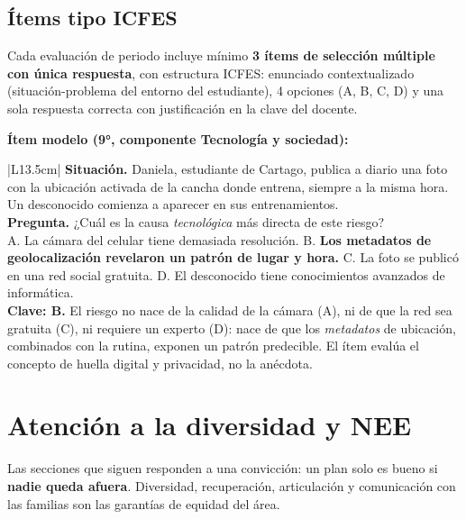 \documentclass[12pt, a4paper]{article}
\begin{document}
\subsection{Ítems tipo ICFES}

Cada evaluación de periodo incluye mínimo \textbf{3 ítems de selección múltiple
con única respuesta}, con estructura ICFES: enunciado contextualizado (situación-problema
del entorno del estudiante), 4 opciones (A, B, C, D) y una sola respuesta correcta
con justificación en la clave del docente.

\noindent\textbf{Ítem modelo (9°, componente Tecnología y sociedad):}

\begin{center}
\begin{tabular}{|L{13.5cm}|}
\hline
{}
\textbf{Situación.} Daniela, estudiante de Cartago, publica a diario una foto con
la ubicación activada de la cancha donde entrena, siempre a la misma hora. Un
desconocido comienza a aparecer en sus entrenamientos. \\
\hline
\textbf{Pregunta.} ¿Cuál es la causa \textit{tecnológica} más directa de este riesgo? \\
A. La cámara del celular tiene demasiada resolución. \newline
B. \textbf{Los metadatos de geolocalización revelaron un patrón de lugar y hora.} \newline
C. La foto se publicó en una red social gratuita. \newline
D. El desconocido tiene conocimientos avanzados de informática. \\
\hline
{}
\textbf{Clave: B.} El riesgo no nace de la calidad de la cámara (A), ni de que la
red sea gratuita (C), ni requiere un experto (D): nace de que los \textit{metadatos}
de ubicación, combinados con la rutina, exponen un patrón predecible. El ítem
evalúa el concepto de huella digital y privacidad, no la anécdota. \\
\hline
\end{tabular}
\end{center}

\section{Atención a la diversidad y NEE}

\noindent Las secciones que siguen responden a una convicción: un plan solo es
bueno si \textbf{nadie queda afuera}. Diversidad, recuperación, articulación y
comunicación con las familias son las garantías de equidad del área.
\end{document}

